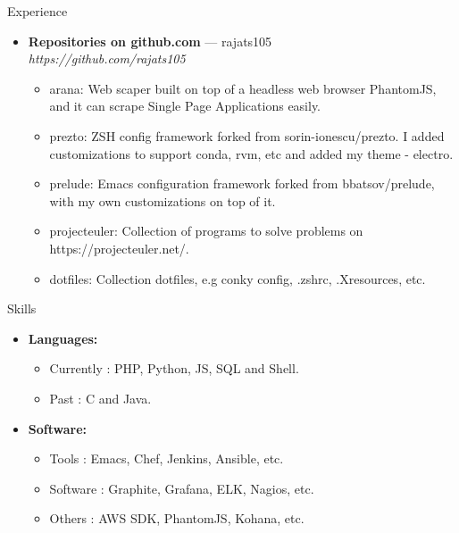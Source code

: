 \documentclass[a4paper,11pt,oneside]{article}
\newenvironment{ressection}[1]{
  \vspace{4pt}
         {\fontfamily{phv}\selectfont\Large#1}
         \begin{itemize}
           \vspace{3pt}
}{
         \end{itemize}
}
\newcommand{\resitem}[1]{
  \vspace{-4pt}
\item \begin{flushleft} #1 \end{flushleft}
}
\newcommand{\ressubitem}[1]{
  \vspace{-1pt}
\item \begin{flushleft} #1 \end{flushleft}
}
\newcommand{\resbigitem}[3]{
  \vspace{-5pt}
\item
  \textbf{#1} --- #2 \\
  \textit{#3}
}
\newenvironment{ressubsec}[3]{
  \resbigitem{#1}{#2}{#3}
  \vspace{-2pt}
  \begin{itemize}
}{
  \end{itemize}
}
\newenvironment{reslist}[1]{
  \resitem{\textbf{#1}}
  \vspace{-5pt}
  \begin{itemize}
}{
  \end{itemize}
}
\begin{document}
\begin{ressection}{Experience}
  \begin{ressubsec}{Repositories on github.com}{rajats105}{https://github.com/rajats105}
    \ressubitem{
      arana: Web scaper built on top of a headless web browser
      PhantomJS, and it can scrape Single Page Applications easily.
    }
    \ressubitem{
      prezto: ZSH config framework forked from sorin-ionescu/prezto.
      I added customizations to support conda, rvm, etc and added my
      theme - electro.
    }
    \ressubitem{
      prelude: Emacs configuration framework forked from
      bbatsov/prelude, with my own customizations on top of it.
    }
    \ressubitem{
      projecteuler: Collection of programs to solve problems on
      https://projecteuler.net/.
    }
    \ressubitem{
      dotfiles: Collection dotfiles, e.g conky config, .zshrc,
      .Xresources, etc.
    }
  \end{ressubsec}
\end{ressection}


\begin{ressection}{Skills}
  \begin{reslist}{Languages:}
    \ressubitem{Currently : PHP, Python, JS, SQL and Shell.}
    \ressubitem{Past : C and Java.}
  \end{reslist}
  \begin{reslist}{Software:}
    \ressubitem{Tools : Emacs, Chef, Jenkins, Ansible, etc.}
    \ressubitem{Software : Graphite, Grafana, ELK, Nagios, etc.}
    \ressubitem{Others : AWS SDK, PhantomJS, Kohana, etc.}
  \end{reslist}
\end{ressection}
\end{document}
